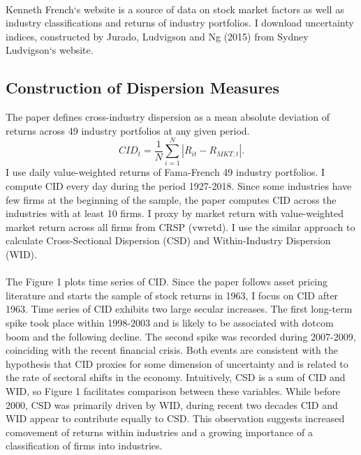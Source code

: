 \documentclass[12pt]{article}
\begin{document}
\paragraph{}
Kenneth French`s website is a source of data on stock market factors as well as industry classifications and returns of industry portfolios. I download uncertainty indices, constructed by Jurado, Ludvigson and Ng (2015) from Sydney Ludvigson`s website. 

\subsection{Construction of Dispersion Measures}

The paper defines cross-industry dispersion as a mean absolute deviation of returns across 49 industry portfolios at any given period. 
$$CID_t = \frac{1}{N}\sum^{N}_{i=1}{|R_{it}-R_{MKT,t}|}.$$
I use daily value-weighted returns of Fama-French 49 industry portfolios. I compute CID every day during the period 1927-2018. Since some industries have few firms at the beginning of the sample, the paper computes CID across the industries with at least 10 firms. I proxy by market return with value-weighted market return across all firms from CRSP (vwretd). I use the similar approach to calculate Cross-Sectional Dispersion (CSD) and Within-Industry Dispersion (WID).
\paragraph{}
The Figure 1 plots time series of CID. Since the paper follows asset pricing literature and starts the sample of stock returns in 1963, I focus on CID after 1963. Time series of CID exhibits two large secular increases. The first long-term spike took place within 1998-2003 and is likely to be associated with dotcom boom and the following decline. The second spike was recorded during 2007-2009, coinciding with the recent financial crisis. Both events are consistent with the hypothesis that CID proxies for some dimension of uncertainty and is related to the rate of sectoral shifts in the economy. Intuitively, CSD is a sum of CID and WID, so Figure 1 facilitates comparison between these variables. While before 2000, CSD was primarily driven by WID, during recent two decades CID and WID appear to contribute equally to CSD. This observation suggests increased comovement of returns within industries and a growing importance of a classification of firms into industries.
\end{document}
